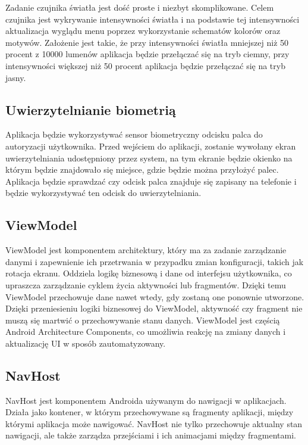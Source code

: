 Zadanie czujnika światła jest dość proste i niezbyt skomplikowane.
Celem czujnika jest wykrywanie intensywności światła i na podstawie tej intensywności aktualizacja wyglądu menu poprzez wykorzystanie schematów kolorów oraz motywów. Założenie jest takie, że przy intensywności światła mniejszej niż 50 procent z 10000 lumenów aplikacja będzie przełączać się na tryb ciemny, przy intensywności większej niż 50 procent aplikacja będzie przełączać się na tryb jasny.

\subsection{Uwierzytelnianie biometrią}
Aplikacja będzie wykorzystywać sensor biometryczny odcisku palca do autoryzacji użytkownika. Przed wejściem do aplikacji, zostanie wywołany ekran uwierzytelniania udostępniony przez system, na tym ekranie będzie okienko na którym będzie znajdowało się miejsce, gdzie będzie można przyłożyć palec. Aplikacja będzie sprawdzać czy odcisk palca znajduje się zapisany na telefonie i będzie wykorzystywać ten odcisk do uwierzytelniania.

\subsection{ViewModel}

ViewModel jest komponentem architektury, który ma za zadanie zarządzanie danymi i zapewnienie ich przetrwania w przypadku zmian konfiguracji, takich jak rotacja ekranu. Oddziela logikę biznesową i dane od interfejsu użytkownika, co upraszcza zarządzanie cyklem życia aktywności lub fragmentów. Dzięki temu ViewModel przechowuje dane nawet wtedy, gdy zostaną one ponownie utworzone.\\


Dzięki przeniesieniu logiki biznesowej do ViewModel, aktywność czy fragment nie muszą się martwić o przechowywanie stanu danych. ViewModel jest częścią Android Architecture Components, co umożliwia reakcję na zmiany danych i aktualizację UI w sposób zautomatyzowany.

\subsection{NavHost}

NavHost jest komponentem Androida używanym do nawigacji w aplikacjach. Działa jako kontener, w którym przechowywane są fragmenty aplikacji, między którymi aplikacja może nawigować. NavHost nie tylko przechowuje aktualny stan nawigacji, ale także zarządza przejściami i ich animacjami między fragmentami.

